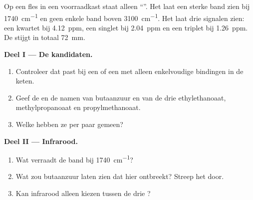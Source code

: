 \begin{problem}
\label{pb:g12:proton-nmr:1}
Op een fles  in een voorraadkast staat alleen
``''. Het  laat een sterke band zien bij
\qty{1740}{cm^{-1}} en geen enkele band boven \qty{3100}{cm^{-1}}. Het
 laat drie signalen zien: een kwartet bij \qty{4.12}{ppm},
een singlet bij \qty{2.04}{ppm} en een triplet bij \qty{1.26}{ppm}. De
 stijgt in totaal \qty{72}{mm}.

\medskip
\noindent\textbf{Deel I --- De kandidaten.}
\begin{enumerate}
  \item Controleer dat  past bij een  of een 
        met alleen enkelvoudige bindingen in de keten.
  \item Geef de  en de namen van butaanzuur en
        van de drie  ethylethanoaat, methylpropanoaat en
        propylmethanoaat.
  \item Welke  hebben ze per paar gemeen?
\end{enumerate}

\medskip
\noindent\textbf{Deel II --- Infrarood.}
\begin{enumerate}[resume]
  \item Wat verraadt de band bij \qty{1740}{cm^{-1}}?
  \item Wat zou butaanzuur laten zien dat hier ontbreekt? Streep het
        door.
  \item Kan infrarood alleen kiezen tussen de drie ?
\end{enumerate}


\end{problem}
